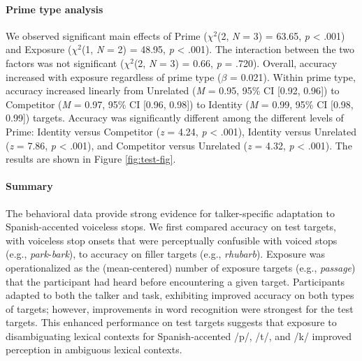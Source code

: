 \documentclass[
  12pt,
  twoside]{article}
\begin{document}
\hypertarget{prime-type-analysis}{%
\paragraph{Prime type analysis}\label{prime-type-analysis}}

We observed significant main effects of Prime (\(\chi^2\)(2, \emph{N} = 3) = 63.65, \emph{p} \textless{} .001) and Exposure (\(\chi^2\)(1, \emph{N} = 2) = 48.95, \emph{p} \textless{} .001).
The interaction between the two factors was not significant (\(\chi^2\)(2, \emph{N} = 3) = 0.66, \emph{p} = .720).
Overall, accuracy increased with exposure regardless of prime type (\(\beta\) = 0.021).
Within prime type, accuracy increased linearly from Unrelated (\emph{M} = 0.95, 95\% CI {[}0.92, 0.96{]}) to Competitor (\emph{M} = 0.97, 95\% CI {[}0.96, 0.98{]}) to Identity (\emph{M} = 0.99, 95\% CI {[}0.98, 0.99{]}) targets.
Accuracy was significantly different among the different levels of Prime: Identity versus Competitor (\emph{z} = 4.24, \emph{p} \textless{} .001), Identity versus Unrelated (\emph{z} = 7.86, \emph{p} \textless{} .001), and Competitor versus Unrelated (\emph{z} = 4.32, \emph{p} \textless{} .001).
The results are shown in Figure \ref{fig:test-fig}.

\hypertarget{summary}{%
\paragraph{Summary}\label{summary}}

The behavioral data provide strong evidence for talker-specific adaptation to Spanish-accented voiceless stops.
We first compared accuracy on test targets, with voiceless stop onsets that were perceptually confusible with voiced stops (e.g., \emph{park}-\emph{bark}), to accuracy on filler targets (e.g., \emph{rhubarb}).
Exposure was operationalized as the (mean-centered) number of exposure targets (e.g., \emph{passage}) that the participant had heard before encountering a given target.
Participants adapted to both the talker and task, exhibiting improved accuracy on both types of targets; however, improvements in word recognition were strongest for the test targets.
This enhanced performance on test targets suggests that exposure to disambiguating lexical contexts for Spanish-accented /p/, /t/, and /k/ improved perception in ambiguous lexical contexts.
\end{document}
